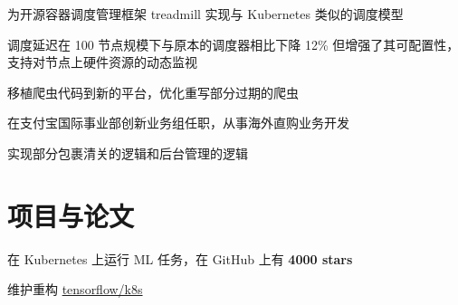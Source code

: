 \documentclass[]{deedy-resume-openfont}
\begin{document}
\begin{minipage}[t]{0.68\textwidth}
\begin{tightemize}
\item 为开源容器调度管理框架 treadmill 实现与 Kubernetes 类似的调度模型
\item 调度延迟在 100 节点规模下与原本的调度器相比下降 12\% 但增强了其可配置性，支持对节点上硬件资源的动态监视
\end{tightemize}
\sectionsep

\begin{tightemize}
\item 移植爬虫代码到新的平台，优化重写部分过期的爬虫
\end{tightemize}
\sectionsep

\begin{tightemize}
\item 在支付宝国际事业部创新业务组任职，从事海外直购业务开发
\item 实现部分包裹清关的逻辑和后台管理的逻辑
\end{tightemize}
\sectionsep


\section{项目与论文}
\sectionsep

\begin{tightemize}
    \item 在 Kubernetes 上运行 ML 任务，在 GitHub 上有 \textbf{4000 stars}
    \item 维护重构 \href{https://github.com/tensorflow/k8s}{tensorflow/k8s}
    \end{tightemize}
\sectionsep


% 
% 

\end{minipage}
\end{document}
